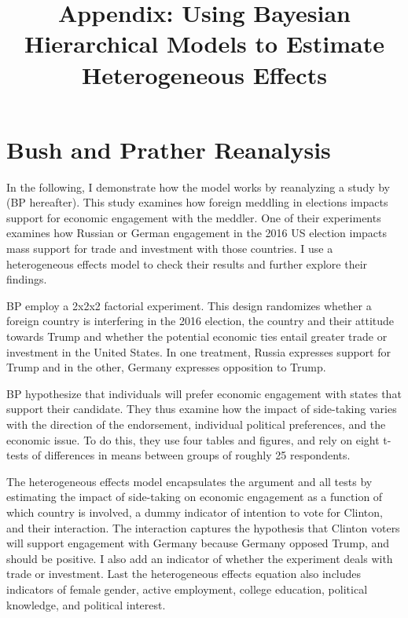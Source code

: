 \documentclass[12pt]{article}
\title{\textbf{Appendix: Using Bayesian Hierarchical Models to Estimate Heterogeneous Effects}}
\date{}
\begin{document}
\maketitle 

\singlespace 

\tableofcontents

\bigskip





\section{Bush and Prather Reanalysis}


In the following, I demonstrate how the model works by reanalyzing a study by \citet{BushPrather2020} (BP hereafter). 
This study examines how foreign meddling in elections impacts support for economic engagement with the meddler. 
One of their experiments examines how Russian or German engagement in the 2016 US election impacts mass support for trade and investment with those countries.
I use a heterogeneous effects model to check their results and further explore their findings. 


BP employ a 2x2x2 factorial experiment.
This design randomizes whether a foreign country is interfering in the 2016 election, the country and their attitude towards Trump and whether the potential economic ties entail greater trade or investment in the United States.
In one treatment, Russia expresses support for Trump and in the other, Germany expresses opposition to Trump. 


BP hypothesize that individuals will prefer economic engagement with states that support their candidate. 
They thus examine how the impact of side-taking varies with the direction of the endorsement, individual political preferences, and the economic issue. 
To do this, they use four tables and figures, and rely on eight t-tests of differences in means between groups of roughly 25 respondents. 


The heterogeneous effects model encapsulates the argument and all tests by estimating the impact of side-taking on economic engagement as a function of which country is involved, a dummy indicator of intention to vote for Clinton, and their interaction. 
The interaction captures the hypothesis that Clinton voters will support engagement with Germany because Germany opposed Trump, and should be positive. 
I also add an indicator of whether the experiment deals with trade or investment. 
Last the heterogeneous effects equation also includes indicators of female gender, active employment, college education, political knowledge, and political interest. 
\end{document}
